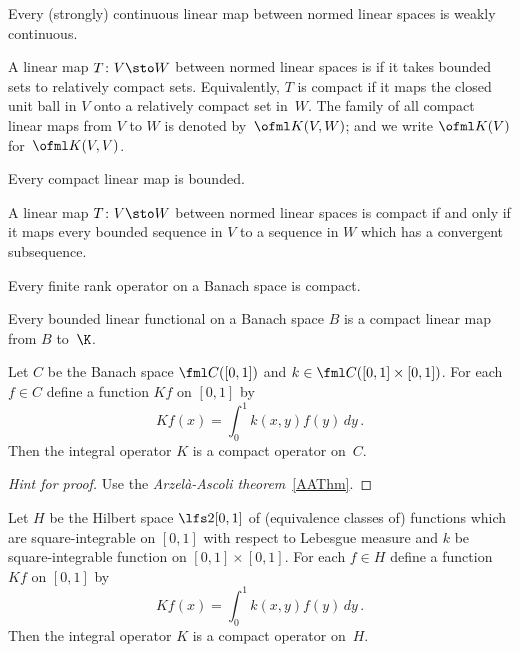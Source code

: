 \begin{prop} Every (strongly) continuous linear map between normed linear spaces is weakly continuous.
\end{prop}

\begin{defn} A linear map $T\colon V \sto W$ between normed linear spaces is
 if it takes bounded sets to relatively compact sets. Equivalently, $T$ is compact if it
maps the closed unit ball in $V$ onto a relatively compact set in~$W$.   The family of all compact linear maps
from $V$ to $W$ is denoted
by~$\ofml K(V,W)$; and we write $\ofml K(V)$ for~$\ofml K(V,V)$.
\end{defn}

\begin{prop} Every compact linear map is bounded.
\end{prop}

\begin{prop} A linear map $T\colon V \sto W$ between normed linear spaces is compact if and only if it maps
every bounded sequence in $V$ to a sequence in $W$ which has a convergent subsequence.
\end{prop}

\begin{exam} Every finite rank operator on a Banach space is compact.
\end{exam}

\begin{exam} Every bounded linear functional on a Banach space $B$ is a compact linear map from $B$ to~$\K$.
\end{exam}

\begin{exam} Let $C$ be the Banach space $\fml C([0,1])$ and $k \in \fml C([0,1] \times [0,1])$.  For each $f \in C$
define a function $Kf$ on $[0,1]$ by
   \[ Kf(x) = \int_0^1 k(x,y)f(y)\,dy\,. \]
Then the integral operator $K$ is a compact operator on~$C$.
\end{exam}

\begin{proof}[\emph{Hint for proof}] Use the \emph{Arzel\`a-Ascoli theorem}~\ref{AAThm}.  \ns
\end{proof}

\begin{exam}\label{X_square_int_kernel} Let $H$ be the Hilbert space $\lfs2{[0,1]}$ of (equivalence classes of) functions which
are square-integrable on $[0,1]$ with respect to Lebesgue measure and
$k$ be square-integrable function
on $[0,1] \times [0,1]$.  For each $f \in H$ define a function $Kf$ on $[0,1]$ by
   \[ Kf(x) = \int_0^1 k(x,y)f(y)\,dy\,. \]
Then the integral operator $K$ is a compact operator on~$H$.
\end{exam}

